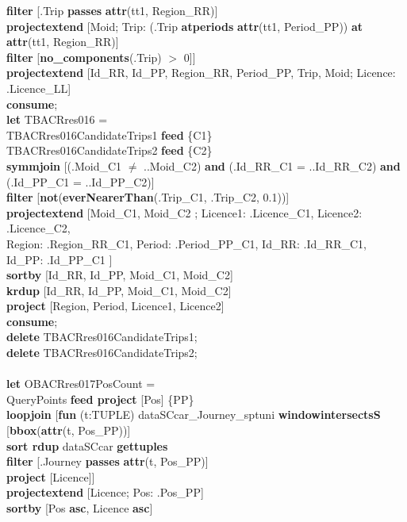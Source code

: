\documentclass[a4paper]{article}
\newcommand{\op}[1]{\textbf{#1}}
\begin{document}
\begin{scriptsize}
\begin{tabbing}
\>\>\op{filter} [.Trip \op{passes}  \op{attr}(tt1, Region\_RR)]\\
\>\>\op{projectextend} [Moid; Trip: (.Trip \op{atperiods} \op{attr}(tt1, Period\_PP)) \op{at} \op{attr}(tt1, Region\_RR)]\\
\>\>\op{filter} [\op{no\_components}(.Trip) $>$ 0]]\\
\>\op{projectextend} [Id\_RR, Id\_PP, Region\_RR, Period\_PP, Trip, Moid; Licence: .Licence\_LL]\\
\op{consume};\\
\op{let} TBACRres016 =\\
\>TBACRres016CandidateTrips1 \op{feed} \{C1\}\\
\>TBACRres016CandidateTrips2 \op{feed} \{C2\}\\
\>\op{symmjoin} [(.Moid\_C1 $\neq$ ..Moid\_C2) \op{and} (.Id\_RR\_C1 = ..Id\_RR\_C2) \op{and} (.Id\_PP\_C1 = ..Id\_PP\_C2)]\\
\>\op{filter} [\op{not}(\op{everNearerThan}(.Trip\_C1, .Trip\_C2, 0.1))]\\
\>\op{projectextend} [Moid\_C1, Moid\_C2 ; Licence1: .Licence\_C1, Licence2: .Licence\_C2,\\
\>\>\> Region: .Region\_RR\_C1, Period: .Period\_PP\_C1, Id\_RR: .Id\_RR\_C1, Id\_PP: .Id\_PP\_C1 ]\\
\>\op{sortby} [Id\_RR, Id\_PP, Moid\_C1, Moid\_C2]\\
\>\op{krdup} [Id\_RR, Id\_PP, Moid\_C1, Moid\_C2]\\
\>\op{project} [Region, Period, Licence1, Licence2]\\
\op{consume};\\
\op{delete} TBACRres016CandidateTrips1;\\
\op{delete} TBACRres016CandidateTrips2;\\
\\
\op{let} OBACRres017PosCount =\\
\>QueryPoints \op{feed project} [Pos] \{PP\}\\
\>\op{loopjoin} [\op{fun} (t:TUPLE) dataSCcar\_Journey\_sptuni \op{windowintersectsS} [\op{bbox}(\op{attr}(t, Pos\_PP))]\\
\>\>\op{sort rdup} dataSCcar \op{gettuples}\\
\>\>\op{filter} [.Journey \op{passes} \op{attr}(t, Pos\_PP)]\\
\>\>\op{project} [Licence]]\\
\>\op{projectextend} [Licence; Pos: .Pos\_PP]\\
\>\op{sortby} [Pos \op{asc}, Licence \op{asc}]\\

\end{tabbing}
\end{scriptsize}
\end{document}
